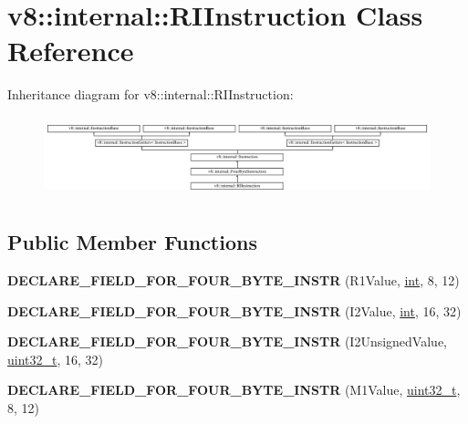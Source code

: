 \hypertarget{classv8_1_1internal_1_1RIInstruction}{}\section{v8\+:\+:internal\+:\+:R\+I\+Instruction Class Reference}
\label{classv8_1_1internal_1_1RIInstruction}
Inheritance diagram for v8\+:\+:internal\+:\+:R\+I\+Instruction\+:\begin{figure}[H]
\begin{center}
\leavevmode
\includegraphics[height=2.364865cm]{classv8_1_1internal_1_1RIInstruction}
\end{center}
\end{figure}
\subsection*{Public Member Functions}
\begin{DoxyCompactItemize}
\item 
\mbox{\label{classv8_1_1internal_1_1RIInstruction_aeb82f6441ef31423a591d533d5b7d1c6}} 
{\bfseries D\+E\+C\+L\+A\+R\+E\+\_\+\+F\+I\+E\+L\+D\+\_\+\+F\+O\+R\+\_\+\+F\+O\+U\+R\+\_\+\+B\+Y\+T\+E\+\_\+\+I\+N\+S\+TR} (R1\+Value, \mbox{\hyperlink{classint}{int}}, 8, 12)
\item 
\mbox{\label{classv8_1_1internal_1_1RIInstruction_ace19f458b4ff0ae71a1cdcfba6e99cdb}} 
{\bfseries D\+E\+C\+L\+A\+R\+E\+\_\+\+F\+I\+E\+L\+D\+\_\+\+F\+O\+R\+\_\+\+F\+O\+U\+R\+\_\+\+B\+Y\+T\+E\+\_\+\+I\+N\+S\+TR} (I2\+Value, \mbox{\hyperlink{classint}{int}}, 16, 32)
\item 
\mbox{\label{classv8_1_1internal_1_1RIInstruction_a718007b01060dac0cd288e8b62196bee}} 
{\bfseries D\+E\+C\+L\+A\+R\+E\+\_\+\+F\+I\+E\+L\+D\+\_\+\+F\+O\+R\+\_\+\+F\+O\+U\+R\+\_\+\+B\+Y\+T\+E\+\_\+\+I\+N\+S\+TR} (I2\+Unsigned\+Value, \mbox{\hyperlink{classuint32__t}{uint32\+\_\+t}}, 16, 32)
\item 
\mbox{\label{classv8_1_1internal_1_1RIInstruction_acfbc93c45ad8e637b1ecb96b44003aa2}} 
{\bfseries D\+E\+C\+L\+A\+R\+E\+\_\+\+F\+I\+E\+L\+D\+\_\+\+F\+O\+R\+\_\+\+F\+O\+U\+R\+\_\+\+B\+Y\+T\+E\+\_\+\+I\+N\+S\+TR} (M1\+Value, \mbox{\hyperlink{classuint32__t}{uint32\+\_\+t}}, 8, 12)
\end{DoxyCompactItemize}
